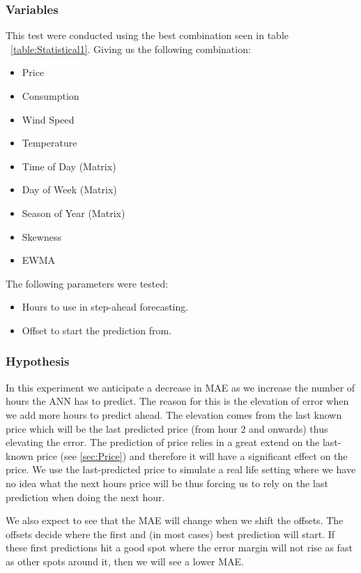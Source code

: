 \subsubsection{Variables}
This test were conducted using the best combination seen in table ~\ref{table:Statistical1}. Giving us the following combination:
\begin{itemize}
	\item Price
	\item Consumption
	\item Wind Speed
	\item Temperature
	\item Time of Day (Matrix)
	\item Day of Week (Matrix)
	\item Season of Year (Matrix)
	\item Skewness
	\item EWMA
\end{itemize}

The following parameters were tested:

\begin{itemize}
	\item Hours to use in step-ahead forecasting.
	\item Offset to start the prediction from.
\end{itemize}

\subsubsection{Hypothesis}
In this experiment we anticipate a decrease in MAE as we increase the number of hours the ANN has to predict. The reason for this is the elevation of error when we add more hours to predict ahead. The elevation comes from the last known price which will be the last predicted price (from hour 2 and onwards) thus elevating the error. The prediction of price relies in a great extend on the last-known price (see \ref{sec:Price}) and therefore it will have a significant effect on the price. We use the last-predicted price to simulate a real life setting where we have no idea what the next hours price will be thus forcing us to rely on the last prediction when doing the next hour.

We also expect to see that the MAE will change when we shift the offsets. The offsets decide where the first and (in most cases) best prediction will start. If these first predictions hit a good spot where the error margin will not rise as fast as other spots around it, then we will see a lower MAE.

